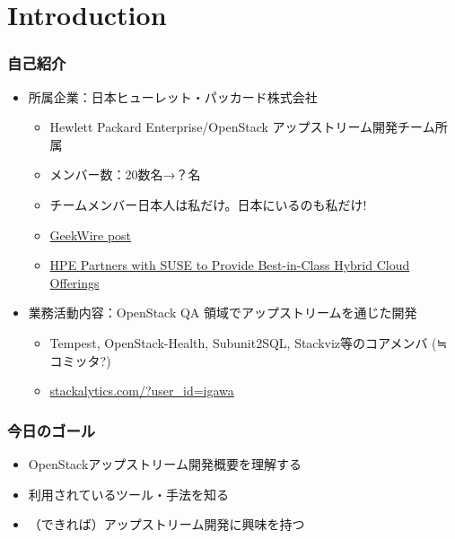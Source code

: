 \documentclass[aspectratio=169,11pt,hyperref={colorlinks=true}]{beamer}
\begin{document}
\section{Introduction}
\begin{frame}
  \frametitle{自己紹介}
  \begin{itemize}
    \item 所属企業：日本ヒューレット・パッカード株式会社
      \begin{itemize}
        \item Hewlett Packard Enterprise/OpenStack アップストリーム開発チーム所属
        \item メンバー数：20数名→？名
        \item チームメンバー日本人は私だけ。日本にいるのも私だけ!
        \item \href{http://www.geekwire.com/2016/struggling-keep-pace-cloud-hewlett-packard-enterprise-cuts-staff/}{GeekWire post}
        \item \href{https://www.hpe.com/us/en/newsroom/news-archive/statement/2016/11/HPE-Partners-with-SUSE-to-Provide-Best-in-Class-Hybrid-Cloud-Offerings.html}{HPE Partners with SUSE to Provide Best-in-Class Hybrid Cloud Offerings}
      \end{itemize}
    \item 業務活動内容：OpenStack QA 領域でアップストリームを通じた開発
      \begin{itemize}
        \item Tempest, OpenStack-Health, Subunit2SQL, Stackviz等のコアメンバ (≒ コミッタ?)
        \item \href{http://stackalytics.com/?user_id=igawa&release=all&metric=all}{stackalytics.com/?user\_id=igawa}
      \end{itemize}
  \end{itemize}
\end{frame}

\begin{frame}
  \frametitle{今日のゴール}
  \begin{itemize}
    \item OpenStackアップストリーム開発概要を理解する
    \item 利用されているツール・手法を知る
    \item （できれば）アップストリーム開発に興味を持つ
  \end{itemize}
\end{frame}
\end{document}

